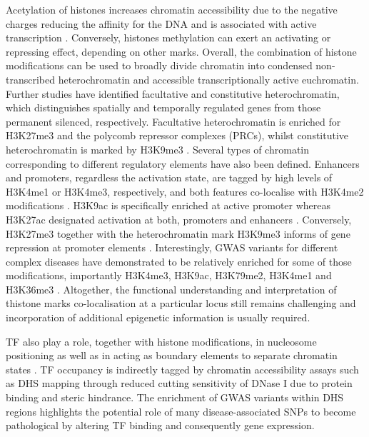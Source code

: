 Acetylation of histones increases chromatin accessibility due to the negative charges reducing the affinity for the DNA and is associated with active transcription \parencite{}. Conversely, histones methylation can exert an activating or repressing effect, depending on other marks. Overall, the combination of histone modifications can be used to broadly divide chromatin into condensed non-transcribed heterochromatin and accessible transcriptionally active euchromatin. Further studies have identified facultative and constitutive heterochromatin, which distinguishes spatially and temporally regulated genes from those permanent silenced, respectively. Facultative heterochromatin is enriched for H3K27me3 and the polycomb repressor complexes (PRCs), whilst constitutive heterochromatin is marked by H3K9me3 \parencite{Hansen2008,Bannister2001}. Several types of chromatin corresponding to different regulatory elements have also been defined. Enhancers and promoters, regardless the activation state, are tagged by high levels of H3K4me1 or H3K4me3, respectively, and both features co-localise with H3K4me2 modifications \parencite{Heintzman2007,Hon2009}. H3K9ac is specifically enriched at active promoter whereas H3K27ac designated activation at both, promoters and enhancers \parencite{Hon2009,Creyghton2010}. Conversely, H3K27me3 together with the heterochromatin mark H3K9me3 informs of gene repression at promoter elements \parencite{Hansen2008,Bannister2001,Pan2007}. Interestingly, GWAS variants for different complex diseases have demonstrated to be relatively enriched for some of those modifications, importantly H3K4me3, H3K9ac, H3K79me2, H3K4me1 and H3K36me3 \parencite{Ernst2011, Trynka2013}. Altogether, the functional understanding and interpretation of thistone marks co-localisation at a particular locus still remains challenging and incorporation of additional epigenetic information is usually required. 

TF also play a role, together with histone modifications, in nucleosome positioning as well as in acting as boundary elements to separate chromatin states \parencite{Vierstra2014,Zhang2009,Bell2000}. TF occupancy is indirectly tagged by chromatin accessibility assays such as DHS mapping through reduced cutting sensitivity of DNase I due to protein binding and steric hindrance. The enrichment of GWAS variants within DHS regions highlights the potential role of many disease-associated SNPs to become pathological by altering TF binding and consequently gene expression.



